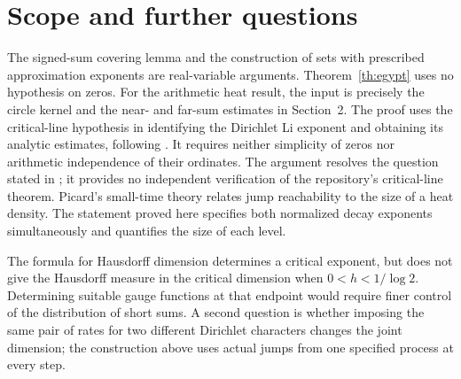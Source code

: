 \documentclass[11pt]{article}
\begin{document}
\section*{Scope and further questions}
The signed-sum covering lemma and the construction of sets with prescribed approximation exponents are real-variable arguments. Theorem~\ref{th:egypt} uses no hypothesis on zeros. For the arithmetic heat result, the input is precisely the circle kernel and the near- and far-sum estimates in Section~2. The proof uses the critical-line hypothesis in identifying the Dirichlet Li exponent and obtaining its analytic estimates, following \cite{repoLi,repoRec,lagarias}. It requires neither simplicity of zeros nor arithmetic independence of their ordinates. The argument resolves the question stated in \cite{repoLi}; it provides no independent verification of the repository's critical-line theorem. Picard's small-time theory \cite{picard} relates jump reachability to the size of a heat density. The statement proved here specifies both normalized decay exponents simultaneously and quantifies the size of each level.

The formula for Hausdorff dimension determines a critical exponent, but does not give the Hausdorff measure in the critical dimension when $0<h<1/\log2$. Determining suitable gauge functions at that endpoint would require finer control of the distribution of short sums. A second question is whether imposing the same pair of rates for two different Dirichlet characters changes the joint dimension; the construction above uses actual jumps from one specified process at every step.
\end{document}
